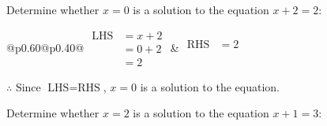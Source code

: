 \documentclass[12pt]{article}
\newcounter{minipagecount}
\begin{document}
\begin{multicols}{2}
\begin{minipage}[t]{0.40\textwidth}
    \noindent Determine whether \(x = 0\) is a solution to the equation \(x + 2 = 2\):
    \vspace{4pt}  %

    \noindent
    \renewcommand{\arraystretch}{1.3} %
    \begin{tabular}{@{}p{0.60\linewidth}@{}p{0.40\linewidth}@{}}
        \(\begin{aligned}
            \text{LHS} &= x + 2 \\
                    &= 0 + 2 \\
                    &= 2
        \end{aligned}\) &
        \(\begin{aligned}
            \text{RHS} &= 2\\
                    & \\
                    &
        \end{aligned}\)
    \end{tabular}
    \renewcommand{\arraystretch}{1.0} %
    \vspace{2pt}  %

    \noindent \(\therefore\) Since \(\text{LHS} = \text{RHS}\), \(x = 0\) is  a solution to the equation.

\end{minipage}

 \vspace*{16pt}
\noindent{(\theminipagecount)}\hspace{0.1mm} %
\begin{minipage}[t]{0.40\textwidth} %

    \noindent Determine whether \(x = 2\) is a solution to the equation \(x + 1 = 3\):
    \vspace{4pt}  %


\end{minipage}
\end{multicols}
\end{document}

